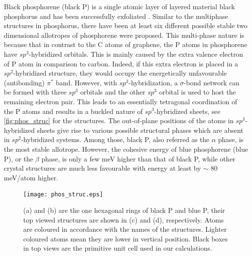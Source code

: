 Black phosphorene (black P) is a single atomic layer of layered material black phosphorus and has been successfully exfoliated \cite{Han2014,Li2014}. Similar to the multiphase structures in phosphorus, there have been at least six different possible stable two dimensional allotropes of phosphorene were proposed\cite{Zhu2014,Guan2014a,Wu2015}. This multi-phase nature is because that in contrast to the C atoms of graphene, the P atoms in phosphorene have $sp^3$-hybridized orbitals. This is mainly caused by the extra valence electron of P atom in comparison to carbon. Indeed, if this extra electron is placed in a $sp^2$-hybridized structure, they would occupy the energetically unfavourable (antibonding) $\pi^*$ band. However, with $sp^3$-hybridization, a $\sigma$-bond network can be formed with three $sp^3$ orbitals and the other $sp^3$ orbital is used to host the remaining electron pair. This leads to an essentially tetragonal coordination of the P atoms and results in a buckled nature of $sp^3$-hybridized sheets, see \autoref{fig:phos_struc} for the structures. The out-of-plane positions of the atoms in $sp^3$-hybridized sheets give rise to various possible structural phases which are absent in $sp^2$-hybridized systems. Among those, black P, also referred as the $\alpha$ phase, is the most stable allotrope. However, the cohesive energy of blue phosphorene (blue P), or the $\beta$ phase, is only a few meV higher than that of black P, while other crystal structures are much less favourable with energy at least by $\sim$ 80 meV/atom higher.  

\begin{figure}[htbp] 
\centering
\texttt{[image: phos\_struc.eps]}%
\caption[Black and blue phosphorene structures]{(a) and (b) are the one hexagonal rings of black P and blue P, their top viewed structures are shown in (c) and (d), respectively. Atoms are coloured in accordance with the names of the structures. Lighter coloured atoms mean they are lower in vertical position. Black boxes in top views are the primitive unit cell used in our calculations. }
\label{fig:phos_struc}
\end{figure}

